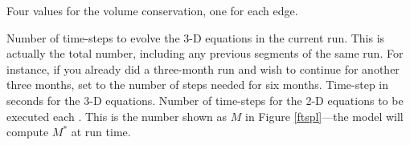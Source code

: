 \begin{klist}
\begin{klist}
        Four values for the volume conservation, one
for each edge.
     \end{klist}
    \mbox{}
     \begin{klist}
           Number of time-steps to evolve the 3-D
       equations in the current run.  This is actually the total
     number, including any previous segments of the same run.  For
     instance, if you already did a three-month run and wish to
     continue for another three months, set  to the
     number of steps needed for six months.
               Time-step in seconds for the 3-D equations.
          Number of time-steps for the 2-D equations
     to be executed each . This is the number shown as $M$
     in Figure \ref{ftspl}---the model will compute $M^\ast$ at run
     time.
     \end{klist}
    \mbox{}


\end{klist}

